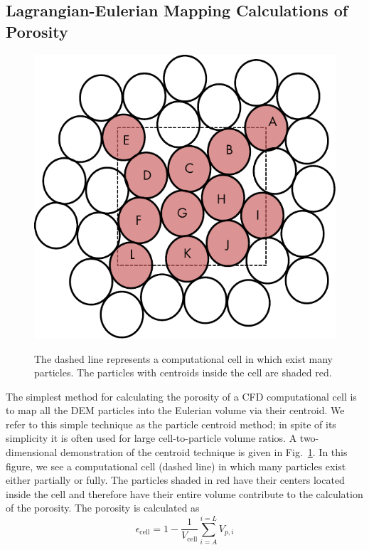 \subsection{Lagrangian-Eulerian Mapping Calculations of Porosity}\label{sec:lag-eul-mapping}
\begin{figure}[t]
	\centering
	\caption{The dashed line represents a computational cell in which exist many particles. The particles with centroids inside the cell are shaded red.}
	\includegraphics[width=\singleimagewidth]{chapters/figures/void-fraction-cell.pdf}\label{fig:centroid-void-fraction}
\end{figure}
The simplest method for calculating the porosity of a CFD computational cell is to map all the DEM particles into the Eulerian volume via their centroid. We refer to this simple technique as the particle centroid method; in spite of its simplicity it is often used for large cell-to-particle volume ratios.\cite{Xu1997} A two-dimensional demonstration of the centroid technique is given in Fig.~\ref{fig:centroid-void-fraction}. In this figure, we see a computational cell (dashed line) in which many particles exist either partially or fully. The particles shaded in red have their centers located inside the cell and therefore have their entire volume contribute to the calculation of the porosity. The porosity is calculated as
\begin{equation}
	\epsilon_\text{cell} = 1-\frac{1}{V_\text{cell}}\sum_{i = A}^{i=L}V_{p,i}
\end{equation}
